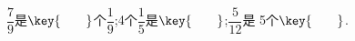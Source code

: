 $\dfrac {7}{9}$是$\key{\qquad}$个$\dfrac {1}{9}$;4个$\dfrac {1}{5}$是$\key{\qquad}$;$\dfrac {5}{12}$是
5个$\key{\qquad}$.